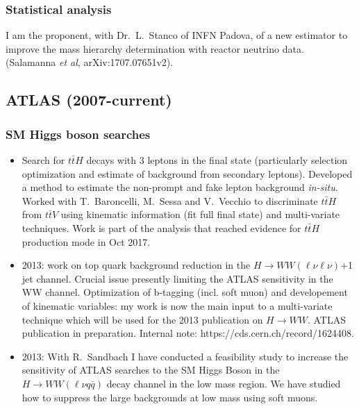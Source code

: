 \documentclass{article}
\begin{document}
\begin{vita}
\subsubsection*{Statistical analysis}
I am the proponent, with Dr.~L.~Stanco of INFN Padova, of a new estimator to improve the mass hierarchy determination with reactor neutrino data. (Salamanna {\it et al}, arXiv:1707.07651v2).

\subsection*{ATLAS (2007-current)}
\subsubsection*{SM Higgs boson searches}
\begin {itemize}
\item Search for $t\bar{t}H$ decays with 3 leptons in the final state (particularly selection optimization and estimate of background from secondary leptons). Developed a method to estimate the non-prompt and fake lepton background {\it in-situ}. Worked with T.~Baroncelli, M.~Sessa and V.~Vecchio to discriminate $t\bar{t}H$ from $t\bar{t}V$ using kinematic information (fit full final state) and multi-variate techniques. Work is part of the analysis that reached evidence for $t\bar{t}H$ production mode in Oct 2017.  
\item 2013: work on top quark background reduction in the $H\rightarrow W W (\ell \nu \ell \nu)$+1 jet channel. Crucial issue presently limiting the ATLAS sensitivity in the WW channel. Optimization of b-tagging (incl. soft muon) and developement of kinematic variables: my work is now the main input to a multi-variate technique which will be used for the 2013 publication on $H\rightarrow W W$. ATLAS publication in preparation. Internal note: https://cds.cern.ch/record/1624408.
\item 2013: With R.~Sandbach I have conducted a feasibility study to increase the sensitivity of ATLAS searches to the SM Higgs Boson in the $H\rightarrow W W (\ell \nu q \bar{q})$ decay channel in the low mass region. We have studied how to suppress the large backgrounds at low mass using soft muons.
\end{itemize}


\end{vita}
\end{document}

